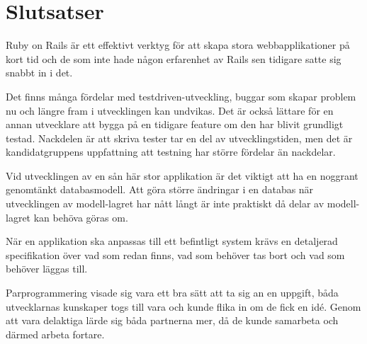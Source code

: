 \section{Slutsatser}
Ruby on Rails är ett effektivt verktyg för att skapa stora webbapplikationer på kort tid och de som inte hade någon erfarenhet av Rails sen tidigare satte sig snabbt in i det.

Det finns många fördelar med testdriven-utveckling, buggar som skapar problem nu och längre fram i utvecklingen kan undvikas. Det är också lättare för en annan utvecklare att bygga på en tidigare feature om den har blivit grundligt testad. Nackdelen är att skriva tester tar en del av utvecklingstiden, men det är kandidatgruppens uppfattning att testning har större fördelar än nackdelar.

Vid utvecklingen av en sån här stor applikation är det viktigt att ha en noggrant genomtänkt databasmodell. Att göra större ändringar i en databas när utvecklingen av modell-lagret har nått långt är inte praktiskt då delar av modell-lagret kan behöva göras om.

När en applikation ska anpassas till ett befintligt system krävs en detaljerad specifikation över vad som redan finns, vad som behöver tas bort och vad som behöver läggas till.

Parprogrammering visade sig vara ett bra sätt att ta sig an en uppgift, båda utvecklarnas kunskaper togs till vara och kunde flika in om de fick en idé. Genom att vara delaktiga lärde sig båda partnerna mer, då de kunde samarbeta och därmed arbeta fortare.